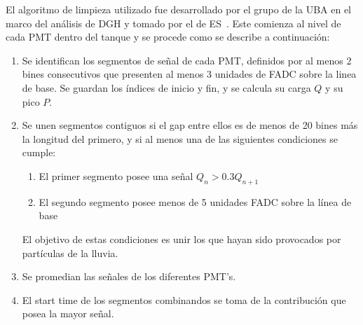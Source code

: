 		El algoritmo de limpieza utilizado fue desarrollado por el grupo de la UBA en el marco del an\'alisis de DGH y tomado por el de ES~\cite{trace_cleaning,cite:tesisJavier,cite:tesisYann}.
		Este comienza al nivel de cada PMT dentro del tanque y se procede como se describe a continuaci\'on:
		\begin{enumerate}
		 \item Se identifican los segmentos de señal de cada PMT, definidos por al menos 2 bines consecutivos que presenten al menos 3 unidades de FADC sobre la linea de base.
		 Se guardan los índices de inicio y fin, y se calcula su carga $Q$ y su pico $P$.
		 \item Se unen segmentos contiguos si el gap entre ellos es de menos de 20 bines más la longitud del primero, y si al menos una de las siguientes condiciones se cumple:
		 \begin{enumerate}
		  \item El primer segmento posee una señal $Q_n>0.3Q_{n+1}$
		  \item El segundo segmento posee menos de 5 unidades FADC sobre la línea de base
		 \end{enumerate}
		El objetivo de estas condiciones es unir los que hayan sido provocados por partículas de la lluvia.
		\item Se promedian las señales de los diferentes PMT's.
		\item El start time de los segmentos combinandos se toma de la contribución que posea la mayor señal.
		\end{enumerate}
		
